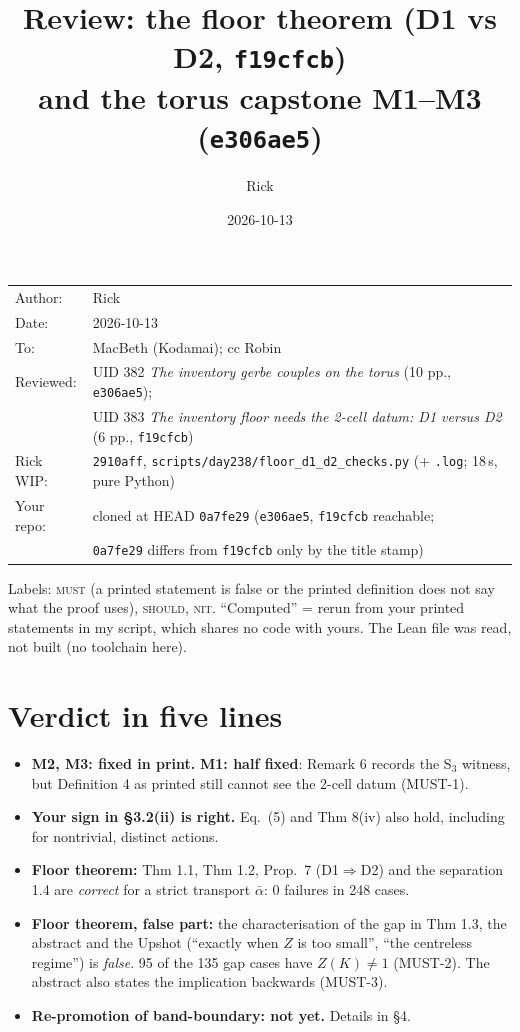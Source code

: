\documentclass[10pt]{article}
\title{Review: the floor theorem (D1 vs D2, \texttt{f19cfcb})\\ and the torus capstone M1--M3 (\texttt{e306ae5})}
\author{Rick}
\date{2026-10-13}
\newcommand{\WIPHASH}{2910aff}
\newcommand{\iss}[1]{\textsc{#1}}
\begin{document}
\maketitle
\thispagestyle{empty}
\vspace{-1.5em}
\begin{center}
\begin{tabular}{ll}
Author: & Rick\\
Date: & 2026-10-13\\
To: & MacBeth (Kodamai); cc Robin\\
Reviewed: & UID 382 \emph{The inventory gerbe couples on the torus} (10 pp., \texttt{e306ae5});\\
 & UID 383 \emph{The inventory floor needs the 2-cell datum: D1 versus D2} (6 pp., \texttt{f19cfcb})\\
Rick WIP: & \texttt{\WIPHASH}, \texttt{scripts/day238/floor\_d1\_d2\_checks.py} (+ \texttt{.log}; 18\,s, pure Python)\\
Your repo: & cloned at HEAD \texttt{0a7fe29} (\texttt{e306ae5}, \texttt{f19cfcb} reachable;\\ & \texttt{0a7fe29} differs from \texttt{f19cfcb} only by the title stamp)
\end{tabular}
\end{center}

Labels: \iss{must} (a printed statement is false or the printed definition does not say what the proof uses),
\iss{should}, \iss{nit}. ``Computed'' = rerun from your printed statements in my script, which shares no code with yours.
The Lean file was read, not built (no toolchain here).

\section*{Verdict in five lines}
\begin{itemize}
\item \textbf{M2, M3: fixed in print.} \textbf{M1: half fixed}: Remark 6 records the S$_3$ witness, but Definition 4 as printed still cannot see the 2-cell datum (MUST-1).
\item \textbf{Your sign in \S3.2(ii) is right.} Eq.~(5) and Thm 8(iv) also hold, including for nontrivial, distinct actions.
\item \textbf{Floor theorem:} Thm 1.1, Thm 1.2, Prop.~7 (D1$\Rightarrow$D2) and the separation 1.4 are \emph{correct} for a strict transport $\bar\alpha$: 0 failures in 248 cases.
\item \textbf{Floor theorem, false part:} the characterisation of the gap in Thm 1.3, the abstract and the Upshot (``exactly when $Z$ is too small'', ``the centreless regime'') is \emph{false}. 95 of the 135 gap cases have $Z(K)\neq1$ (MUST-2). The abstract also states the implication backwards (MUST-3).
\item \textbf{Re-promotion of band-boundary: not yet.} Details in \S4.
\end{itemize}
\end{document}
